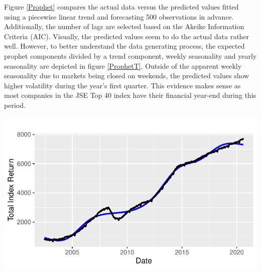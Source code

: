 \documentclass[11pt,preprint, authoryear]{elsarticle}
\let\origfigure\figure
\let\endorigfigure\endfigure
\renewenvironment{figure}[1][2] {
    \expandafter\origfigure\expandafter[H]
} {
    \endorigfigure
}
\numberwithin{equation}{section}
\numberwithin{figure}{section}
\numberwithin{table}{section}
\begin{document}
Figure \ref{Prophet} compares the actual data versus the predicted
values fitted using a piecewise linear trend and forecasting 500
observations in advance. Additionally, the number of lags are selected
based on the Akeike Information Criteria (AIC). Visually, the predicted
values seem to do the actual data rather well. However, to better
understand the data generating process, the expected prophet components
divided by a trend component, weekly seasonality and yearly seasonality
are depicted in figure \ref{ProphetT}. Outside of the apparent weekly
seasonality due to markets being closed on weekends, the predicted
values show higher volatility during the year's first quarter. This
evidence makes sense as most companies in the JSE Top 40 index have
their financial year-end during this period.

\begin{figure}[H]

{\centering \includegraphics{JSE_Top40_Predictions_Using_Machine_Learning_files/figure-latex/unnamed-chunk-2-1} 

}

\caption{Visualisation of Train Prediction (blue) vs Observed Data (black).\label{Prophet}}\label{fig:unnamed-chunk-2}
\end{figure}
\end{document}
